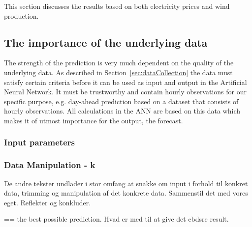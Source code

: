 This section discusses the results based on both electricity prices and wind production.


\subsection{The importance of the underlying data}
The strength of the prediction is very much dependent on the quality of the underlying data. As described in Section~\ref{sec:dataCollection} the data must satisfy certain criteria before it can be used as input and output in the Artificial Neural Network. It must be trustworthy and contain hourly observations for our specific purpose, e.g. day-ahead prediction based on a dataset that consists of hourly observations. All calculations in the ANN are based on this data which makes it of utmost importance for the output, the forecast.


\subsubsection{Input parameters}





\subsubsection{Data Manipulation - k}
De andre tekster undlader i stor omfang at snakke om input i forhold til konkret data, trimming og manipulation af det konkrete data. Sammenstil det med vores eget. Reflekter og konkluder.

== the best possible prediction. Hvad er med til at give det ebdsre result.

